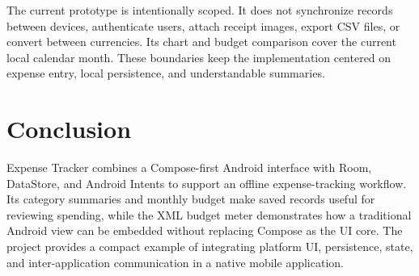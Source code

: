 \documentclass[sigconf,nonacm]{acmart}
\begin{document}
The current prototype is intentionally scoped. It does not synchronize records between devices, authenticate users, attach receipt images, export CSV files, or convert between currencies. Its chart and budget comparison cover the current local calendar month. These boundaries keep the implementation centered on expense entry, local persistence, and understandable summaries.

\section{Conclusion}
Expense Tracker combines a Compose-first Android interface with Room, DataStore, and Android Intents to support an offline expense-tracking workflow. Its category summaries and monthly budget make saved records useful for reviewing spending, while the XML budget meter demonstrates how a traditional Android view can be embedded without replacing Compose as the UI core. The project provides a compact example of integrating platform UI, persistence, state, and inter-application communication in a native mobile application.
\end{document}
